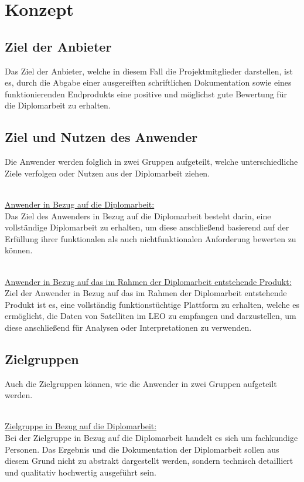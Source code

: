 \section{Konzept}
\subsection{Ziel der Anbieter}
Das Ziel der Anbieter, welche in diesem Fall die Projektmitglieder darstellen, ist es, durch die Abgabe einer ausgereiften schriftlichen Dokumentation sowie eines funktionierenden Endprodukts eine positive und möglichst gute Bewertung für die Diplomarbeit zu erhalten.

\subsection{Ziel und Nutzen des Anwender}
Die Anwender werden folglich in zwei Gruppen aufgeteilt, welche unterschiedliche Ziele verfolgen oder Nutzen aus der Diplomarbeit ziehen.\\\

\underline{Anwender in Bezug auf die Diplomarbeit:}\\
Das Ziel des Anwenders in Bezug auf die Diplomarbeit besteht darin, eine vollständige Diplomarbeit zu erhalten, um diese anschließend basierend auf der Erfüllung ihrer funktionalen als auch nichtfunktionalen Anforderung bewerten zu können. \\\

\underline{Anwender in Bezug auf das im Rahmen der Diplomarbeit entstehende Produkt:}\\ 
Ziel der Anwender in Bezug auf das im Rahmen der Diplomarbeit entstehende Produkt ist es, eine vollständig funktionstüchtige Plattform zu erhalten, welche es ermöglicht, die Daten von Satelliten im LEO zu empfangen und darzustellen, um diese anschließend für Analysen oder Interpretationen zu verwenden.

\subsection{Zielgruppen}
Auch die Zielgruppen können, wie die Anwender in zwei Gruppen aufgeteilt werden.\\\

\underline{Zielgruppe in Bezug auf die Diplomarbeit: }\\
Bei der Zielgruppe in Bezug auf die Diplomarbeit handelt es sich um fachkundige Personen. Das Ergebnis und die Dokumentation der Diplomarbeit sollen aus diesem Grund nicht zu abstrakt dargestellt werden, sondern technisch detailliert und qualitativ hochwertig ausgeführt sein.\\\

